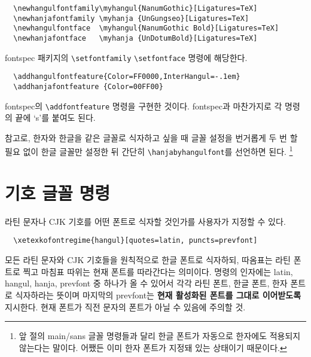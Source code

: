 \documentclass[a4paper]{article}
\def\cs#1{\texttt{\textbackslash #1}}
\def\hemph#1{\textsf{\bfseries #1}}
\def\keyword#1{\leavevmode\marginpar{\hfuzz\maxdimen\footnotesize\cs{#1}}}
\begin{document}
\begin{verbatim}
  \newhangulfontfamily\myhangul{NanumGothic}[Ligatures=TeX]
  \newhanjafontfamily \myhanja {UnGungseo}[Ligatures=TeX]
  \newhangulfontface  \myhangul{NanumGothic Bold}[Ligatures=TeX]
  \newhanjafontface   \myhanja {UnDotumBold}[Ligatures=TeX]
\end{verbatim}
fontspec 패키지의 \verb+\setfontfamily+ \verb+\setfontface+ 명령에 해당한다.

\begin{verbatim}
  \addhangulfontfeature{Color=FF0000,InterHangul=-.1em}
  \addhanjafontfeature {Color=00FF00}
\end{verbatim}
fontspec의 \verb+\addfontfeature+ 명령을 구현한 것이다.
fontspec과 마찬가지로 각 명령의 끝에 `s'를 붙여도 된다.

참고로, 한자와 한글을 같은 글꼴로 식자하고 싶을 때 글꼴 설정을
번거롭게 두 번 할 필요 없이 한글 글꼴만 설정한 뒤 간단히
\keyword{hanjabyhangulfont}%
\cs{hanjabyhangulfont}를 선언하면 된다.%
\footnote{앞 절의 main/sans 글꼴 명령들과 달리 한글 폰트가 자동으로
  한자에도 적용되지 않는다는 말이다. 어쨌든 이미 한자 폰트가 지정돼 있는
  상태이기 때문이다.}


\section{기호 글꼴 명령}\label{sec:symbolfont}
라틴 문자나 CJK 기호를 어떤 폰트로 식자할 것인가를 사용자가 지정할 수 있다.
\begin{verbatim}
  \xetexkofontregime{hangul}[quotes=latin, puncts=prevfont]
\end{verbatim}
모든 라틴 문자와 CJK 기호들을 원칙적으로 한글 폰트로 식자하되,
따옴표는 라틴 폰트로 찍고 마침표 따위는 현재 폰트를 따라간다는 의미이다.
명령의 인자에는 latin, hangul, hanja, prevfont 중 하나가 올 수 있어서
각각 라틴 폰트, 한글 폰트, 한자 폰트로 식자하라는 뜻이며
마지막의 prevfont는 \hemph{현재 활성화된 폰트를 그대로 이어받도록} 지시한다.
현재 폰트가 직전 문자의 폰트가 아닐 수 있음에 주의할 것.
\end{document}
